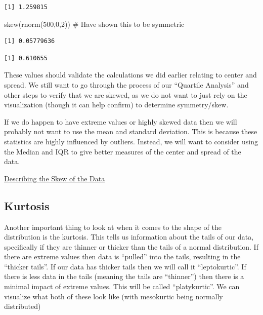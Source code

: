 \documentclass[
  letterpaper,
  DIV=11,
  numbers=noendperiod]{scrreprt}
\newenvironment{Shaded}{\begin{snugshade}}{\end{snugshade}}
\newcommand{\CommentTok}[1]{\textcolor[rgb]{0.37,0.37,0.37}{#1}}
\newcommand{\DecValTok}[1]{\textcolor[rgb]{0.68,0.00,0.00}{#1}}
\newcommand{\FunctionTok}[1]{\textcolor[rgb]{0.28,0.35,0.67}{#1}}
\newcommand{\NormalTok}[1]{\textcolor[rgb]{0.00,0.23,0.31}{#1}}
\newcommand{\SpecialCharTok}[1]{\textcolor[rgb]{0.37,0.37,0.37}{#1}}
\begin{document}
\begin{verbatim}
[1] 1.259815
\end{verbatim}

\begin{Shaded}
\begin{Highlighting}[]
\FunctionTok{skew}\NormalTok{(}\FunctionTok{rnorm}\NormalTok{(}\DecValTok{500}\NormalTok{,}\DecValTok{0}\NormalTok{,}\DecValTok{2}\NormalTok{)) }\CommentTok{\# Have shown this to be symmetric}
\end{Highlighting}
\end{Shaded}

\begin{verbatim}
[1] 0.05779636
\end{verbatim}

\begin{Shaded}
\end{Shaded}

\begin{verbatim}
[1] 0.610655
\end{verbatim}

These values should validate the calculations we did earlier relating to
center and spread. We still want to go through the process of our
``Quartile Analysis'' and other steps to verify that we are skewed, as
we do not want to just rely on the visualization (though it can help
confirm) to determine symmetry/skew.

If we do happen to have extreme values or highly skewed data then we
will probably not want to use the mean and standard deviation. This is
because these statistics are highly influenced by outliers. Instead, we
will want to consider using the Median and IQR to give better measures
of the center and spread of the data.

\begin{watch}{}{}
    \href{https://youtu.be/_VHtL0hgaKA}{Describing the Skew of the Data}
\end{watch}

\subsection{Kurtosis}\label{kurtosis}

Another important thing to look at when it comes to the shape of the
distribution is the kurtosis. This tells us information about the tails
of our data, specifically if they are thinner or thicker than the tails
of a normal distribution. If there are extreme values then data is
``pulled'' into the tails, resulting in the ``thicker tails''. If our
data has thicker tails then we will call it ``leptokurtic''. If there is
less data in the tails (meaning the tails are ``thinner'') then there is
a minimal impact of extreme values. This will be called ``platykurtic''.
We can visualize what both of these look like (with mesokurtic being
normally distributed)
\end{document}
